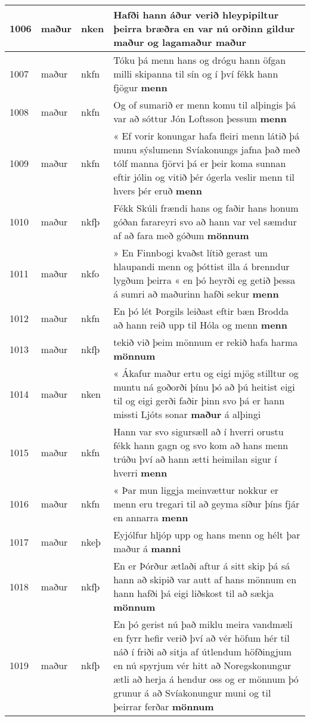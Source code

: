 \documentclass{article}
\begin{document}
\begin{longtable}{p{1cm}|p{1cm}|p{1cm}|p{13cm}}
1006&maður&nken&Hafði hann áður verið hleypipiltur þeirra bræðra en var nú orðinn gildur maður og lagamaður \textbf{maður} \\
\hline
1007&maður&nkfn&Tóku þá menn hans og drógu hann öfgan milli skipanna til sín og í því fékk hann fjögur \textbf{menn} \\
\hline
1008&maður&nkfn&Og of sumarið er menn komu til alþingis þá var að sóttur Jón Loftsson þessum \textbf{menn} \\
\hline
1009&maður&nkfn&« Ef vorir konungar hafa fleiri menn látið þá munu sýslumenn Svíakonungs jafna það með tólf manna fjörvi þá er þeir koma sunnan eftir jólin og vitið þér ógerla veslir menn til hvers þér eruð \textbf{menn} \\
\hline
1010&maður&nkfþ&Fékk Skúli frændi hans og faðir hans honum góðan farareyri svo að hann var vel sæmdur af að fara með góðum \textbf{mönnum} \\
\hline
1011&maður&nkfo&» En Finnbogi kvaðst lítið gerast um hlaupandi menn og þóttist illa á brenndur lygðum þeirra « en þó heyrði eg getið þessa á sumri að maðurinn hafði sekur \textbf{menn} \\
\hline
1012&maður&nkfn&En þó lét Þorgils leiðast eftir bæn Brodda að hann reið upp til Hóla og menn \textbf{menn} \\
\hline
1013&maður&nkfþ&tekið við þeim mönnum er rekið hafa harma \textbf{mönnum} \\
\hline
1014&maður&nken&« Ákafur maður ertu og eigi mjög stilltur og muntu ná goðorði þínu þó að þú heitist eigi til og eigi gerði faðir þinn svo þá er hann missti Ljóts sonar \textbf{maður} á alþingi\\
\hline
1015&maður&nkfn&Hann var svo sigursæll að í hverri orustu fékk hann gagn og svo kom að hans menn trúðu því að hann ætti heimilan sigur í hverri \textbf{menn} \\
\hline
1016&maður&nkfn&« Þar mun liggja meinvættur nokkur er menn eru tregari til að geyma síður þíns fjár en annarra \textbf{menn} \\
\hline
1017&maður&nkeþ&Eyjólfur hljóp upp og hans menn og hélt þar maður á \textbf{manni} \\
\hline
1018&maður&nkfþ&En er Þórður ætlaði aftur á sitt skip þá sá hann að skipið var autt af hans mönnum en hann hafði þá eigi liðskost til að sækja \textbf{mönnum} \\
\hline
1019&maður&nkfþ&En þó gerist nú það miklu meira vandmæli en fyrr hefir verið því að vér höfum hér til náð í friði að sitja af útlendum höfðingjum en nú spyrjum vér hitt að Noregskonungur ætli að herja á hendur oss og er mönnum þó grunur á að Svíakonungur muni og til þeirrar ferðar \textbf{mönnum} \\

\end{longtable}
\end{document}
